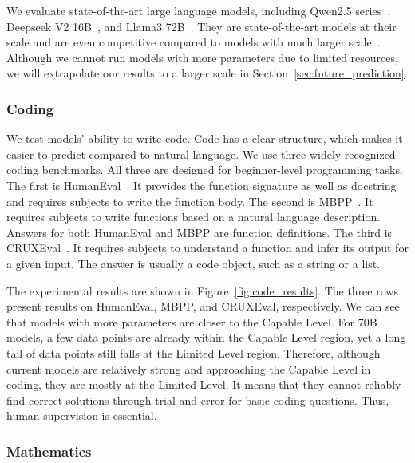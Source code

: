We evaluate state-of-the-art large language models, including Qwen2.5 series~\citep{qwen2, qwen2.5}, Deepseek V2 16B~\citep{deepseekv2}, and Llama3 72B~\citep{dubey2024llama}. They are state-of-the-art models at their scale and are even competitive compared to models with much larger scale~\citep{guo2025deepseek}. 
Although we cannot run models with more parameters due to limited resources, we will extrapolate our results to a larger scale in Section~\ref{sec:future_prediction}.



\subsubsection{Coding}
\label{sec:code_experiment}



We test models' ability to write code. Code has a clear structure, which makes it easier to predict compared to natural language. We use three widely recognized coding benchmarks. All three are designed for beginner-level programming tasks. The first is HumanEval~\citep{chen2021codex}. It provides the function signature as well as docstring and requires subjects to write the function body. The second is MBPP~\citep{austin2021program}. It requires subjects to write functions based on a natural language description. Answers for both HumanEval and MBPP are function definitions. The third is CRUXEval~\citep{gu2024cruxeval}. It requires subjects to understand a function and infer its output for a given input. The answer is usually a code object, such as a string or a list.

The experimental results are shown in Figure~\ref{fig:code_results}. The three rows present results on HumanEval, MBPP, and CRUXEval, respectively. We can see that models with more parameters are closer to the Capable Level. For 70B models, a few data points are already within the Capable Level region, yet a long tail of data points still falls at the Limited Level region. 
Therefore, although current models are relatively strong and approaching the Capable Level in coding,  they are mostly at the Limited Level. It means that they cannot reliably find correct solutions through trial and error for basic coding questions. Thus, human supervision is essential.




\subsubsection{Mathematics}
\label{sec:math_experiment}

